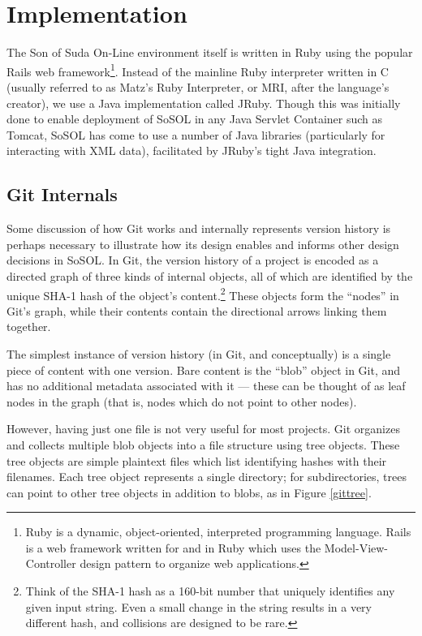 \documentclass[]{article}
\begin{document}
\section*{Implementation}

The Son of Suda On-Line environment itself is written in Ruby using the popular Rails web framework\footnote{Ruby is a dynamic, object-oriented, interpreted programming language. Rails is a web framework written for and in Ruby which uses the Model-View-Controller design pattern to organize web applications.}. Instead of the mainline Ruby interpreter written in C (usually referred to as Matz's Ruby Interpreter, or MRI, after the language's creator), we use a Java implementation called JRuby. Though this was initially done to enable deployment of SoSOL in any Java Servlet Container such as Tomcat, SoSOL has come to use a number of Java libraries (particularly for interacting with XML data), facilitated by JRuby's tight Java integration.

\subsection*{Git Internals}

Some discussion of how Git works and internally represents version history is perhaps necessary to illustrate how its design enables and informs other design decisions in SoSOL. In Git, the version history of a project is encoded as a directed graph of three kinds of internal objects, all of which are identified by the unique SHA-1 hash of the object's content.\footnote{Think of the SHA-1 hash as a 160-bit number that uniquely identifies any given input string. Even a small change in the string results in a very different hash, and collisions are designed to be rare.} These objects form the “nodes” in Git's graph, while their contents contain the directional arrows linking them together.

The simplest instance of version history (in Git, and conceptually) is a single piece of content with one version. Bare content is the “blob” object in Git, and has no additional metadata associated with it — these can be thought of as leaf nodes in the graph (that is, nodes which do not point to other nodes).

However, having just one file is not very useful for most projects. Git organizes and collects multiple blob objects into a file structure using tree objects. These tree objects are simple plaintext files which list identifying hashes with their filenames. Each tree object represents a single directory; for subdirectories, trees can point to other tree objects in addition to blobs, as in Figure \ref{gittree}.
\end{document}
